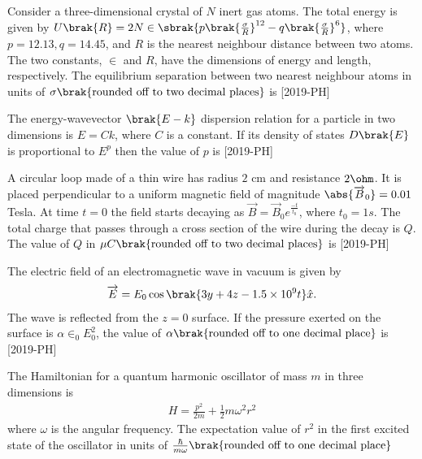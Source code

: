 \iffalse
    \title{Assignment}
    \author{EE24BTECH11066}
    \section{ph}
    \chapter{2019}
  \fi
\item Consider a three-dimensional crystal of $N$ inert gas atoms. The total energy is given by $U\brak{R}=2N \in \sbrak{p\brak{\frac{\sigma}{R}}^{12}-q\brak{\frac{\sigma}{R}}^{6}}$, where $p=12.13, q=14.45$, and $R$ is the nearest neighbour distance between two atoms. The two constants, $\in$ and $R$, have the dimensions of energy and length, respectively. The equilibrium separation between two nearest neighbour atoms in units of $\sigma \brak{\text{rounded off to two decimal places}}$ is \underline{\hspace{1cm}} \hfill{[2019-PH]}\\
\item The energy-wavevector $\brak{E-k}$ dispersion relation for a particle in two dimensions is $E=Ck$, where $C$ is a constant. If its density of states $D\brak{E}$ is proportional to $E^p$ then the value of $p$ is \underline{\hspace{1cm}} \hfill{[2019-PH]}\\
\item A circular loop made of a thin wire has radius $2$ cm and resistance $2\ohm$. It is placed perpendicular to a uniform magnetic field of magnitude $\abs{\overrightarrow{B}_0}=0.01$ Tesla. At time $t=0$ the field starts decaying as $\overrightarrow{B}=\overrightarrow{B}_0 e^{\frac{-t}{t_{0}}}$, where $t_{0}=1s$. The total charge that passes through a cross section of the wire during the decay is $Q$. The value of $Q$ in $\mu C \brak{\text{rounded off to two decimal places}}$ is \underline{\hspace{1cm}} \hfill{[2019-PH]}\\
\item The electric field of an electromagnetic wave in vacuum is given by \\
\begin{align*}
    \overrightarrow{E}=E_{0} \cos \brak{3y+4z-1.5 \times 10^{9} t} \hat{x}.
\end{align*}
The wave is reflected from the $z=0$ surface. If the pressure exerted on the surface is $\alpha\in_{0}E_0^{2}$, the value of $\alpha \brak{\text{rounded off to one decimal place}}$ is  \underline{\hspace{1cm}} \hfill{[2019-PH]}\\
\item The Hamiltonian for a quantum harmonic oscillator of mass $m$ in three dimensions is \\
\begin{align*}
    H=\frac{p^{2}}{2m}+\frac{1}{2}m \omega^{2}r^{2}
\end{align*}
where $\omega$ is the angular frequency. The expectation value of $r^{2}$ in the first excited state of the oscillator in units of $\frac{\hbar}{m\omega} \brak{\text{rounded off to one decimal place}}$


